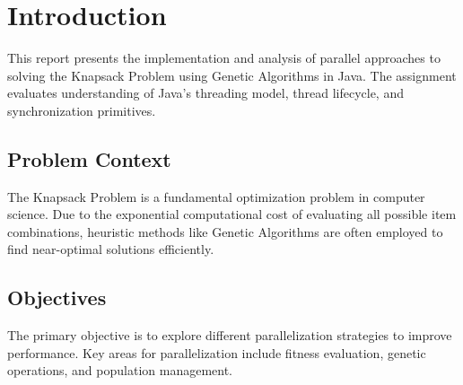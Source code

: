 \chapter{Introduction} \label{cap:intro}

This report presents the implementation and analysis of parallel approaches to
solving the Knapsack Problem using Genetic Algorithms in Java. The assignment
evaluates understanding of Java's threading model, thread lifecycle, and
synchronization primitives.

\section{Problem Context}

The Knapsack Problem is a fundamental optimization problem in computer science.
Due to the exponential computational cost of evaluating all possible item
combinations, heuristic methods like Genetic Algorithms are often employed to
find near-optimal solutions efficiently.

\section{Objectives}

The primary objective is to explore different parallelization strategies to
improve performance. Key areas for parallelization
include fitness evaluation, genetic operations, and population management.